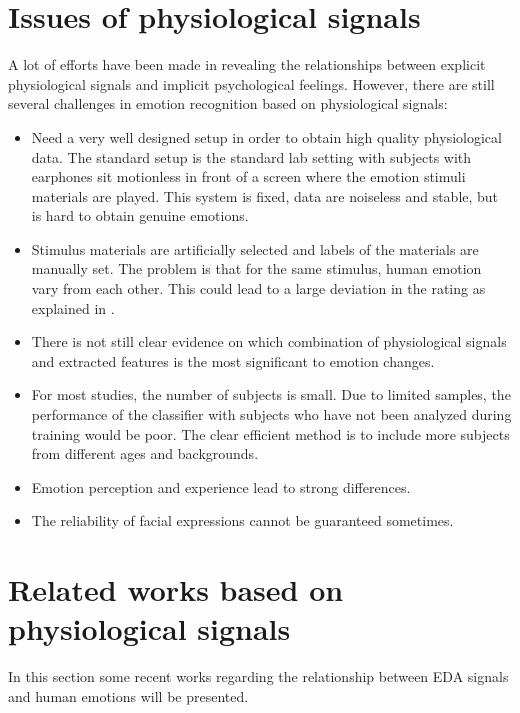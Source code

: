\section{Issues of physiological signals}
A lot of efforts have been made in revealing the relationships between explicit physiological signals and implicit psychological feelings. However, there are still several challenges in emotion recognition based on physiological signals:
\begin{itemize}
	\item Need a very well designed setup in order to obtain high quality physiological data. The standard setup is the standard lab setting with subjects with earphones  sit motionless in front of a screen where the emotion stimuli materials are played. This system is fixed, data are noiseless and stable, but is hard to obtain genuine emotions.
	\item Stimulus materials are artificially selected and labels of the materials are manually set. The problem is that for the same stimulus, human emotion vary from each other. This could lead to a large deviation in the rating as explained in \cite{muhl2011modality}.
	\item There is not still clear evidence on which combination of physiological signals and extracted features is the most significant to emotion changes.
	\item For most studies, the number of subjects is small. Due to limited samples, the performance of the classifier with subjects who have not been analyzed during training would be poor. The clear efficient method is to include more subjects from different ages and backgrounds.
	\item Emotion perception and experience lead to strong differences.
	\item The reliability of facial expressions cannot be guaranteed sometimes.
\end{itemize}

\newpage
\section{Related works based on physiological signals}
In this section some recent works regarding the relationship between EDA signals and human emotions will be presented. 

